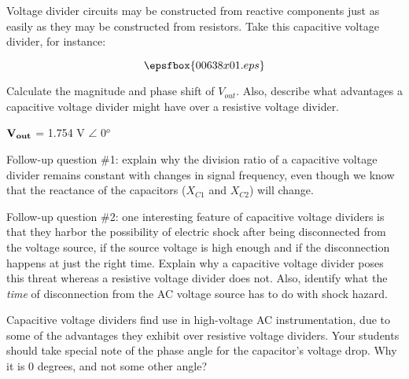

Voltage divider circuits may be constructed from reactive components just as easily as they may be constructed from resistors.  Take this capacitive voltage divider, for instance:

$$\epsfbox{00638x01.eps}$$

Calculate the magnitude and phase shift of $V_{out}$.  Also, describe what advantages a capacitive voltage divider might have over a resistive voltage divider.







${\bf V_{out}}$ = 1.754 V $\angle$ 0$^{o}$

\vskip 10pt

Follow-up question \#1: explain why the division ratio of a capacitive voltage divider remains constant with changes in signal frequency, even though we know that the reactance of the capacitors ($X_{C1}$ and $X_{C2}$) will change.

\vskip 10pt

Follow-up question \#2: one interesting feature of capacitive voltage dividers is that they harbor the possibility of electric shock after being disconnected from the voltage source, if the source voltage is high enough and if the disconnection happens at just the right time.  Explain why a capacitive voltage divider poses this threat whereas a resistive voltage divider does not.  Also, identify what the {\it time} of disconnection from the AC voltage source has to do with shock hazard.







Capacitive voltage dividers find use in high-voltage AC instrumentation, due to some of the advantages they exhibit over resistive voltage dividers.  Your students should take special note of the phase angle for the capacitor's voltage drop.  Why it is 0 degrees, and not some other angle?




